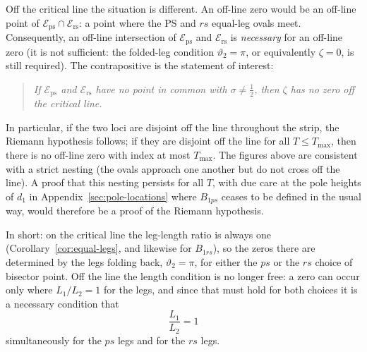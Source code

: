 \documentclass[11pt]{article}
\theoremstyle{definition}
\begin{document}
Off the critical line the situation is different. An off-line zero would be an
off-line point of $\mathcal{E}_{\mathrm{ps}}\cap\mathcal{E}_{\mathrm{rs}}$: a
point where the PS and $rs$ equal-leg ovals meet. Consequently, an off-line
intersection of $\mathcal{E}_{\mathrm{ps}}$ and $\mathcal{E}_{\mathrm{rs}}$ is
\emph{necessary} for an off-line zero (it is not sufficient: the folded-leg
condition $\vartheta_2=\pi$, or equivalently $\zeta=0$, is still required). The
contrapositive is the statement of interest:

\begin{quote}
\emph{If $\mathcal{E}_{\mathrm{ps}}$ and $\mathcal{E}_{\mathrm{rs}}$ have no
point in common with $\sigma\neq\tfrac12$, then $\zeta$ has no zero off the
critical line.}
\end{quote}

In particular, if the two loci are disjoint off the line throughout the strip,
the Riemann hypothesis follows; if they are disjoint off the line for all
$T\le T_{\max}$, then there is no off-line zero with index at most $T_{\max}$.
The figures above are consistent with a strict nesting (the ovals approach one
another but do not cross off the line). A proof that this nesting persists for
all $T$, with due care at the pole heights of $d_1$ in
Appendix~\ref{sec:pole-locations} where $B_{1ps}$ ceases to be defined in
the usual way, would therefore be a proof of the Riemann hypothesis.

In short: on the critical line the leg-length ratio is always one
(Corollary~\ref{cor:equal-legs}, and likewise for $B_{1rs}$), so the
zeros there are determined by the legs folding back,
$\vartheta_2=\pi$, for either the $ps$ or the $rs$ choice of bisector point.
Off the line the length condition is no longer free: a zero can occur only
where $L_1/L_2=1$ for the legs, and since that must hold for both choices it
is a necessary condition that
\begin{equation}\label{eq:both-ratios-one}
\frac{L_1}{L_2}=1
\end{equation}
simultaneously for the $ps$ legs and for the $rs$ legs.
\end{document}

